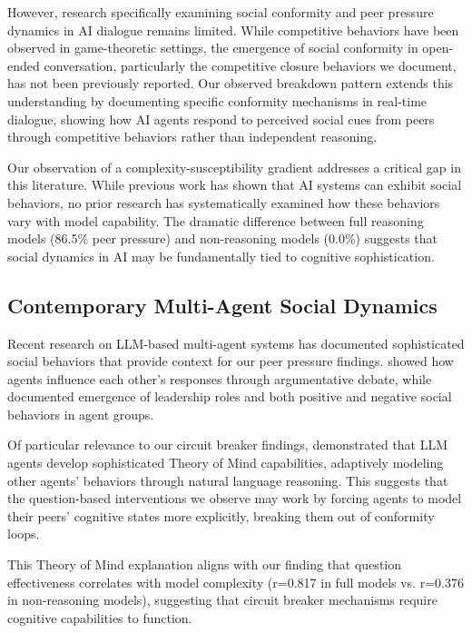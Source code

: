 \documentclass[11pt,letterpaper]{article}
\newcommand{\exponedataPeerPressurePercentage}{86.5\%}
\newcommand{\exponedataQuestionCorrelation}{0.817}
\newcommand{\expthreePeerPressurePercentage}{0.0\%}
\newcommand{\expthreeQuestionCorrelation}{0.376}
\begin{document}
However, research specifically examining social conformity and peer pressure dynamics in AI dialogue remains limited. While competitive behaviors have been observed in game-theoretic settings, the emergence of social conformity in open-ended conversation, particularly the competitive closure behaviors we document, has not been previously reported. Our observed breakdown pattern extends this understanding by documenting specific conformity mechanisms in real-time dialogue, showing how AI agents respond to perceived social cues from peers through competitive behaviors rather than independent reasoning.

Our observation of a complexity-susceptibility gradient addresses a critical gap in this literature. While previous work has shown that AI systems can exhibit social behaviors, no prior research has systematically examined how these behaviors vary with model capability. The dramatic difference between full reasoning models (\exponedataPeerPressurePercentage{} peer pressure) and non-reasoning models (\expthreePeerPressurePercentage{}) suggests that social dynamics in AI may be fundamentally tied to cognitive sophistication.

\subsection{Contemporary Multi-Agent Social Dynamics}

Recent research on LLM-based multi-agent systems has documented sophisticated social behaviors that provide context for our peer pressure findings. \citet{du2023debate} showed how agents influence each other's responses through argumentative debate, while \citet{chen2023agentverse} documented emergence of leadership roles and both positive and negative social behaviors in agent groups.

Of particular relevance to our circuit breaker findings, \citet{li2023theory} demonstrated that LLM agents develop sophisticated Theory of Mind capabilities, adaptively modeling other agents' behaviors through natural language reasoning. This suggests that the question-based interventions we observe may work by forcing agents to model their peers' cognitive states more explicitly, breaking them out of conformity loops.

This Theory of Mind explanation aligns with our finding that question effectiveness correlates with model complexity (r=\exponedataQuestionCorrelation{} in full models vs. r=\expthreeQuestionCorrelation{} in non-reasoning models), suggesting that circuit breaker mechanisms require cognitive capabilities to function.
\end{document}
